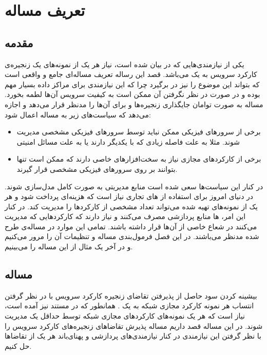 \chapter{تعریف مساله}

\section{مقدمه}
یکی از نیازمندی‌هایی که در \cite{ETSI-MAN} بیان شده است،
نیاز هر یک از نمونه‌های یک زنجیره‌ی کارکرد سرویس به یک 
می‌باشد.
قصد این رساله تعریف مساله‌ای جامع و واقعی است که بتواند این موضوع را نیز در برگیرد
چرا که این نیازمندی برای مراکز داده بسیار مهم بوده
و در صورت در نظر نگرفتن آن ممکن است به کیفیت سرویس آن‌ها لطمه بخورد.
مساله به صورت توامان جایگذاری زنجیره‌ها و  برای آن‌ها را مدنظر قرار می‌دهد و
اجازه می‌دهد که سیاست‌های زیر به مساله اعمال شود:

\begin{itemize}
    \item
    برخی از سرورهای فیزیکی ممکن نباید توسط سرورهای فیزیکی مشخصی مدیریت شوند.
    مثلا به علت فاصله زیادی که با یکدیگر دارند یا به علت مسائل امنیتی
    \item
    برخی از کارکردهای مجازی نیاز به سخت‌افزارهای خاصی دارند که ممکن است تنها بتوانند
    بر روی سرورهای فیزیکی مشخصی قرار گیرند.
\end{itemize}

در کنار این سیاست‌ها سعی شده است منابع مدیریتی به صورت کامل مدل‌سازی شوند.
در دنیای امروز برای استفاده از های تجاری نیاز است
که هزینه‌ای پرداخت شود و هر یک از نمونه‌های تهیه شده می‌تواند تعداد مشخصی از کارکردها را مدیریت کند.
در کنار این امر، ها منابع پردازشی مصرف می‌کنند و
نیاز دارند که کارکردهایی که مدیریت می‌کنند در شعاع خاصی از آن‌ها قرار داشته باشند. تمامی این موارد در مساله‌ی طرح شده مدنظر می‌باشند.
در این فصل فرمول‌بندی مساله و تنظیمات آن را مرور می‌کنیم و در آخر یک مثال از این مساله را می‌بینیم.
 
\section{مساله}

بیشینه کردن سود حاصل از پذیرفتن تقاضای زنجیره‌ کارکرد سرویس با در نظر گرفتن انتساب هر نمونه کارکرد مجازی شبکه به یک .
همانطور که در مستند \cite{ETSI-MAN} نیز آمده است، نیاز است که هر یک نمونه‌های کارکردهای مجازی شبکه
توسط حداقل یک  مدیریت شوند.
در این مساله قصد داریم مساله پذیرش تقاضاهای زنجیره‌های کارکرد سرویس را با نظر گرفتن این نیازمندی در کنار
نیازمندی‌های پردازشی و پهنای‌باند هر یک از تقاضاها حل کنیم.


